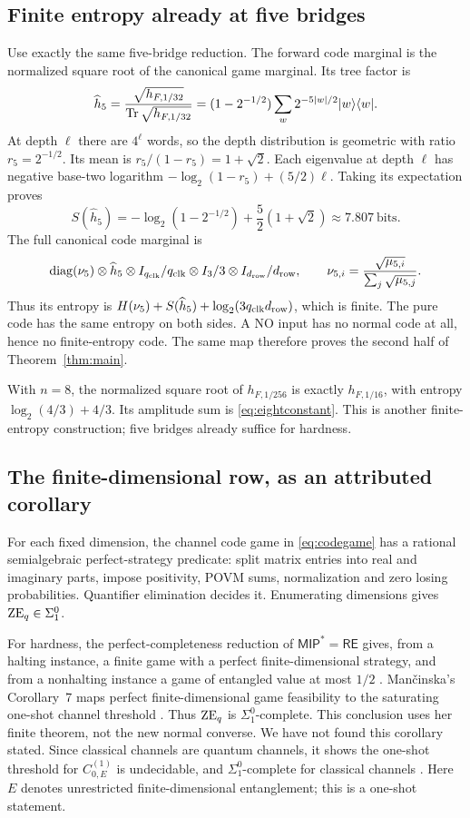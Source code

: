 \subsection{Finite entropy already at five bridges}\label{sec:finiteentropy}
Use exactly the same five-bridge reduction. The forward code marginal is the normalized square root of the canonical game marginal. Its tree factor is
\[
 \widehat h_5=\frac{\sqrt{h_{F,1/32}}}{\operatorname{Tr}\sqrt{h_{F,1/32}}}
 =(1-2^{-1/2})\sum_w2^{-5|w|/2}|w\rangle\langle w|.
\]
At depth $\ell$ there are $4^\ell$ words, so the depth distribution is geometric with ratio $r_5=2^{-1/2}$. Its mean is $r_5/(1-r_5)=1+\sqrt2$. Each eigenvalue at depth $\ell$ has negative base-two logarithm $-\log_2(1-r_5)+(5/2)\ell$. Taking its expectation proves
\begin{equation}\label{eq:fiveentropy}
 S(\widehat h_5)=-\log_2(1-2^{-1/2})+\frac52(1+\sqrt2)
 \approx 7.807\ \text{bits}.
\end{equation}
The full canonical code marginal is
\[
 \operatorname{diag}(\nu_5)\otimes\widehat h_5
 \otimes I_{q_{\mathrm{clk}}}/q_{\mathrm{clk}}\otimes I_3/3\otimes I_{d_{\mathrm{row}}}/d_{\mathrm{row}},
 \qquad \nu_{5,i}=\frac{\sqrt{\mu_{5,i}}}{\sum_j\sqrt{\mu_{5,j}}}.
\]
Thus its entropy is $H(\nu_5)+S(\widehat h_5)+\log_2(3q_{\mathrm{clk}}d_{\mathrm{row}})$, which is finite. The pure code has the same entropy on both sides. A NO input has no normal code at all, hence no finite-entropy code. The same map therefore proves the second half of Theorem~\ref{thm:main}.

\begin{remark}
With $n=8$, the normalized square root of $h_{F,1/256}$ is exactly $h_{F,1/16}$, with entropy $\log_2(4/3)+4/3$. Its amplitude sum is \eqref{eq:eightconstant}. This is another finite-entropy construction; five bridges already suffice for hardness.
\end{remark}

\subsection{The finite-dimensional row, as an attributed corollary}
For each fixed dimension, the channel code game in \eqref{eq:codegame} has a rational semialgebraic perfect-strategy predicate: split matrix entries into real and imaginary parts, impose positivity, POVM sums, normalization and zero losing probabilities. Quantifier elimination decides it. Enumerating dimensions gives $\mathrm{ZE}_q\in\Sigma^0_1$.

For hardness, the perfect-completeness reduction of $\mathsf{MIP}^*=\mathsf{RE}$ gives, from a halting instance, a finite game with a perfect finite-dimensional strategy, and from a nonhalting instance a game of entangled value at most $1/2$ \cite[Theorem~12.6]{MIPRE}. Man\v{c}inska's Corollary~7 maps perfect finite-dimensional game feasibility to the saturating one-shot channel threshold \cite{Mancinska}. Thus $\mathrm{ZE}_q$ is $\Sigma^0_1$-complete. This conclusion uses her finite theorem, not the new normal converse. We have not found this corollary stated. Since classical channels are quantum channels, it shows the one-shot threshold for $C^{(1)}_{0,E}$ is undecidable, and $\Sigma^0_1$-complete for classical channels \cite[Section~1.4]{BMZ}. Here $E$ denotes unrestricted finite-dimensional entanglement; this is a one-shot statement.
